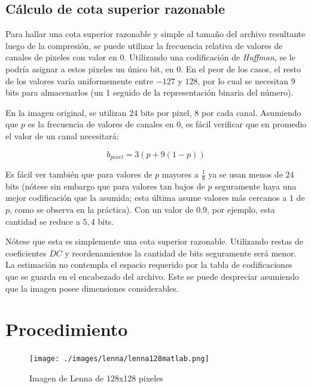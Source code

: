 \documentclass[%
	final,
	reprint,
	notitlepage,
	narroweqnarray,
	inline,
	twoside,
	invited
	]{ieee}
\begin{document}
\subsection{Cálculo de cota superior razonable}

\par Para hallar una cota superior razonable y simple al tamaño del archivo resultante luego de la compresión,
 se puede 
utilizar la frecuencia relativa de valores de canales de pixeles con valor en 0. 
Utilizando una codificación de \textit{Huffman}, 
se le podría asignar a estos pixeles un único bit, en 0. En el peor de los casos, el resto de los valores 
varía uniformemente entre $-127$ y $128$, por lo cual se necesitan 9 bits para almacenarlos (un 1 seguido 
de la representación binaria del número).
\par En la imagen original, se utilizan $24$ bits por pixel, $8$ por cada canal. Asumiendo que $p$ es la frecuencia 
de valores de canales en 0, es fácil verificar que en promedio el valor de un canal necesitará:

\begin{equation}
b_{pixel}=3(p+9(1-p))
\end{equation}

\par Es fácil ver también que para valores de $p$ mayores a $\frac{1}{8}$ ya se usan menos de $24$ bits (nótese sin 
embargo que para valores tan bajos de $p$ seguramente haya una mejor codificación que la asumida; esta última asume 
valores más cercanos a $1$ de $p$, como se observa en la práctica). Con un valor de $0.9$, por ejemplo, esta cantidad 
se reduce a $5,4$ bits.
\par Nótese que esta es simplemente una cota superior razonable. Utilizando restas de coeficientes $DC$ y reordenamientos 
la cantidad de bits seguramente será menor. La estimación no contempla el espacio requerido por la tabla de codificaciones 
que se guarda en el encabezado del archivo. Este se puede despreciar asumiendo que la imagen posee dimensiones considerables.



\section{Procedimiento}


\begin{figure}[H]
\centering
	\texttt{[image: ./images/lenna/lenna128matlab.png]}
	\caption{Imagen de Lenna de 128x128 pixeles}
\label{lenna128}
\end{figure}
\end{document}
